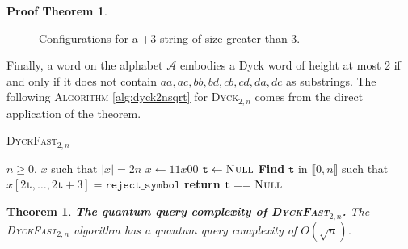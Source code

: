 \documentclass[11pt,a4paper]{article}
\newcommand{\Dyck}[1]{\textsc{Dyck$_{#1}$}}
\newcommand{\Null}{\textsc{Null}}
\theoremstyle{definition}
\theoremstyle{plain}
\newtheorem{theorem}{Theorem}[section]
\theoremstyle{definition}
\newtheorem{tproof}{Proof Theorem}[section]
\begin{document}
\begin{tproof}
\begin{figure}[h!]
\begin{minipage}{.60\textwidth}
            \caption{Configurations for a +3 string of size greater than 3.}
            \label{fig:p3string2piece}
        \end{minipage}
    \end{figure}

\end{tproof}
Finally, a word on the alphabet $\mathcal{A}$ embodies a Dyck word of
height at most 2 if and only if it does not contain $aa, ac, bb, bd, cb, cd, da, dc$
as substrings. The following \textsc{Algorithm} \autoref{alg:dyck2nsqrt} for \Dyck{2, n}
comes from the direct application of the theorem.


\begin{algorithm}
    \caption{\textsc{DyckFast}$_{2,n}$}\label{alg:dyck2nsqrt}
    \begin{algorithmic}
        \Require $n \geq 0$, $x$ such that  $|x| = 2n$
        \State $x \gets 11x00$
        \State $\texttt{t} \gets \Null$
        \If{$t == \Null$}
        \State \textbf{Find} $\texttt{t}$ in $\llbracket0, n\rrbracket$ such that \\
        \hspace*{1cm} $x[2\texttt{t}, \ldots, 2\texttt{t}+3] = \texttt{reject\_symbol}$
        \EndIf
        \EndFor
        \State \textbf{return} $\texttt{t} == \Null$

    \end{algorithmic}
\end{algorithm}

\begin{theorem}{\textbf{The quantum query complexity of \textsc{DyckFast}$_{2,n}$.}}
    The \textsc{DyckFast}$_{2,n}$ algorithm has a quantum query complexity of $O\left(\sqrt{n}\right)$.
\end{theorem}
\end{document}
